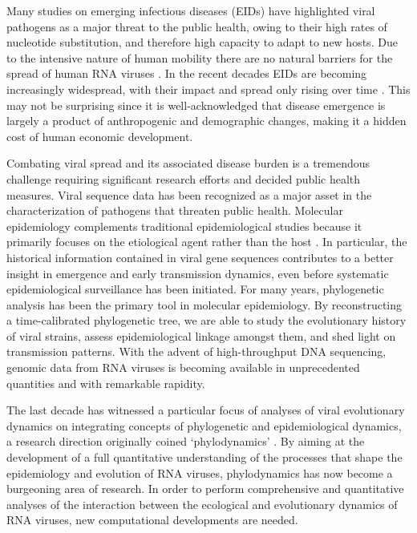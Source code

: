 Many studies on emerging infectious diseases (EIDs) have highlighted viral pathogens as a major threat to the public health, owing to their high rates of nucleotide substitution, and therefore high capacity to adapt to new hosts. 
Due to the intensive nature of human mobility there are no natural barriers for the spread of human RNA viruses \citep{Brockmann2006}.
In the recent decades EIDs are becoming increasingly widespread, with their impact and spread only rising over time \citep{Jones2008}.
This may not be surprising since it is well-acknowledged that disease emergence is largely a product of anthropogenic and demographic changes, making it a hidden cost of human economic development.
 
Combating viral spread and its associated disease burden is a tremendous challenge requiring significant research efforts and decided public health measures. 
Viral sequence data has been recognized as a major asset in the characterization of pathogens that threaten public health.
Molecular epidemiology complements traditional epidemiological studies because it primarily focuses on the etiological agent rather than the host \citep{Leitner2002}.
In particular, the historical information contained in viral gene sequences contributes to a better insight in emergence and early transmission dynamics, even before systematic epidemiological surveillance has been initiated. 
For many years, phylogenetic analysis has been the primary tool in molecular epidemiology. 
By reconstructing a time-calibrated phylogenetic tree, we are able to study the evolutionary history of viral strains, assess epidemiological linkage amongst them, and shed light on transmission patterns. 
With the advent of high-throughput DNA sequencing, genomic data from RNA viruses is becoming available in unprecedented quantities and with remarkable rapidity. 

The last decade has witnessed a particular focus of analyses of viral evolutionary dynamics on integrating concepts of phylogenetic and epidemiological dynamics, a research direction originally coined `phylodynamics' \citep{Grenfell2004}.
By aiming at the development of a full quantitative understanding of the processes that shape the epidemiology and evolution of RNA viruses,
phylodynamics has now become a burgeoning area of research.
In order to perform comprehensive and quantitative analyses of the interaction between the ecological and evolutionary dynamics of RNA viruses, new computational developments are needed.

